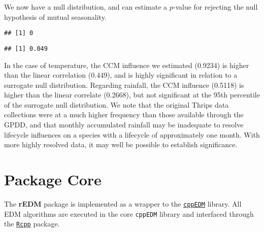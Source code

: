 \documentclass[]{article}
\newenvironment{Shaded}{\begin{snugshade}}{\end{snugshade}}
\newcommand{\DecValTok}[1]{\textcolor[rgb]{0.00,0.00,0.81}{#1}}
\newcommand{\KeywordTok}[1]{\textcolor[rgb]{0.13,0.29,0.53}{\textbf{#1}}}
\newcommand{\NormalTok}[1]{#1}
\newcommand{\OperatorTok}[1]{\textcolor[rgb]{0.81,0.36,0.00}{\textbf{#1}}}
\newcommand{\StringTok}[1]{\textcolor[rgb]{0.31,0.60,0.02}{#1}}
\begin{document}
We now have a null distribution, and can estimate a \(p\)-value for
rejecting the null hypothesis of mutual seasonality.

\begin{Shaded}
\end{Shaded}

\begin{verbatim}
## [1] 0
\end{verbatim}

\begin{Shaded}
\end{Shaded}

\begin{verbatim}
## [1] 0.049
\end{verbatim}

In the case of temperature, the CCM influence we estimated (0.9234) is
higher than the linear correlation (0.449), and is highly significant in
relation to a surrogate null distribution. Regarding rainfall, the CCM
influence (0.5118) is higher than the linear correlate (0.2668), but not
significant at the 95th percentile of the surrogate null distribution.
We note that the original Thrips data collections were at a much higher
frequency than those available through the GPDD, and that monthly
accumulated rainfall may be inadequate to resolve lifecycle influences
on a species with a lifecycle of approximately one month. With more
highly resolved data, it may well be possible to establish significance.

\hypertarget{package-core}{%
\section{Package Core}\label{package-core}}

The \textbf{rEDM} package is implemented as a wrapper to the
\href{github.com/SugiharaLab/cppEDM}{\texttt{cppEDM}} library. All EDM
algorithms are executed in the core \texttt{cppEDM} library and
interfaced through the
\href{cran.r-project.org/web/packages/Rcpp/index.html}{\texttt{Rcpp}}
package.
\end{document}
